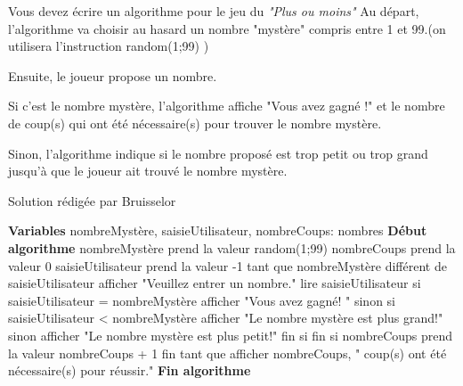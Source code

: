 
%
Vous devez écrire un algorithme pour le jeu du \textit{"Plus ou moins"}
Au départ, l'algorithme va choisir au hasard un nombre "mystère" compris entre 1 et 99.(on utilisera l'instruction random(1;99) )
\par
Ensuite, le joueur propose un nombre.
\par
Si c'est le nombre mystère, l'algorithme affiche "Vous avez gagné !" et le nombre de coup(s) qui ont été nécessaire(s) pour trouver le nombre mystère.
\par
Sinon, l'algorithme indique si le nombre proposé est trop petit ou trop grand jusqu'à que le joueur ait trouvé le nombre mystère.
\begin{corrige}
     Solution rédigée par Bruisselor
     \par
\begin{code}

\textbf{Variables}
        nombreMystère, saisieUtilisateur, nombreCoups: nombres
     \textbf{Début algorithme}
        nombreMystère prend la valeur random(1;99)
        nombreCoups prend la valeur 0
        saisieUtilisateur prend la valeur -1
        tant que nombreMystère différent de saisieUtilisateur
           afficher "Veuillez entrer un nombre."
           lire saisieUtilisateur
           si saisieUtilisateur = nombreMystère
              afficher "Vous avez gagné! "
           sinon
              si saisieUtilisateur < nombreMystère
                 afficher "Le nombre mystère est plus grand!"
              sinon
                 afficher "Le nombre mystère est plus petit!"
              fin si
           fin si
           nombreCoups prend la valeur nombreCoups + 1
        fin tant que
        afficher nombreCoups, " coup(s) ont été nécessaire(s) pour réussir."
\textbf{Fin algorithme}
  
\end{code}
\end{corrige}
